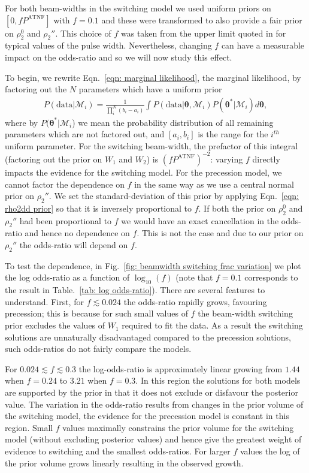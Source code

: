 \documentclass[../full_thesis/full_thesis.tex]{subfiles}
\newcommand{\PATNF}{P^{\mathrm{ATNF}}}
\newcommand{\Wone}{W_{1}}
\newcommand{\Wtwo}{W_{2}}
\newcommand{\M}{\mathcal{M}}
\newcommand{\data}{\textrm{data}}
\newcommand{\params}{\boldsymbol{\theta}}
\begin{document}
For both beam-widths in the switching model we used uniform priors on $[0,
f\PATNF]$ with $f=0.1$ and these were transformed to also provide a fair prior
on $\rho_2^0$ and $\rho_2''$. This choice of $f$ was taken from the upper limit
quoted in \citet{Lyne1988} for typical values of the pulse width.
Nevertheless, changing $f$ can have a measurable impact on the odds-ratio and
so we will now study this effect.

To begin, we rewrite
Eqn.~\eqref{eqn: marginal likelihood}, the marginal
likelihood, by factoring out the $N$ parameters which have a uniform prior
\begin{align}
P(\data| \M_i) =
\frac{1}{\prod_{i}^{N}(b_i - a_i)}
\int P(\data| \params, \M_i)P(\params^{*}|\M_{i}) d\params,
\end{align}
where by $P(\params^{*}| \M_i$) we mean the probability distribution of all
remaining parameters which are not factored out, and $[a_i, b_i]$ is the range
for the $i^{th}$ uniform parameter.  For the switching beam-width, the prefactor of
this integral (factoring out the prior on $\Wone$ and $\Wtwo$) is
$(f\PATNF)^{-2}$: varying $f$ directly impacts the evidence for the switching
model. For the precession model, we cannot factor the dependence on $f$ in the
same way as we use a central normal prior on $\rho_2''$.  We set the
standard-deviation of this prior by applying Eqn.~\eqref{eqn: rho2dd prior} so
that it is inversely proportional to $f$. If both the prior on $\rho_2^0$ and
$\rho_2''$ had been proportional to $f$ we would have an exact cancellation in
the odds-ratio and hence no dependence on $f$. This is not the case and due to
our prior on $\rho_2''$ the odds-ratio will depend on $f$.

To test the dependence, in Fig.~\ref{fig: beamwidth switching frac variation}
we plot the log odds-ratio as a function of $\log_{10}(f)$ (note that $f=0.1$
corresponds to the result in Table.~\ref{tab: log odds-ratio}). There are
several features to understand. First, for $f\lesssim 0.024$ the
odds-ratio rapidly grows, favouring precession; this is because for such small
values of $f$ the beam-width switching prior excludes the values of
$\Wone$ required to fit the data. As a result the switching solutions are
unnaturally disadvantaged compared to the precession solutions, such odds-ratios do not
fairly compare the models.

For $0.024 \lesssim f \lesssim 0.3$ the log-odds-ratio is approximately linear
growing from $1.44$ when $f=0.24$ to $3.21$ when $f=0.3$. In this region the
solutions for both models are supported by the prior in that it does not
exclude or disfavour the posterior value. The variation in the odds-ratio
results from changes in the prior volume of the switching model, the evidence
for the precession model is constant in this region.  Small $f$ values
maximally constrains the prior volume for the switching model (without
excluding posterior values) and hence give the greatest weight of evidence to
switching and the smallest odds-ratios. For larger $f$ values the log of the
prior volume grows linearly resulting in the observed growth.
\end{document}
